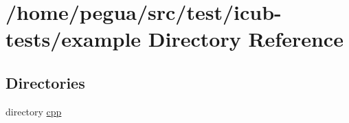 \section{/home/pegua/src/test/icub-\/tests/example Directory Reference}
\label{dir_cfafba98a580ce4b62f8a6fa96d7cbb0}
\subsection*{Directories}
\begin{DoxyCompactItemize}
\item 
directory \hyperlink{dir_c4278cdbadca2a5e8f60a98cd2517319}{cpp}
\end{DoxyCompactItemize}

